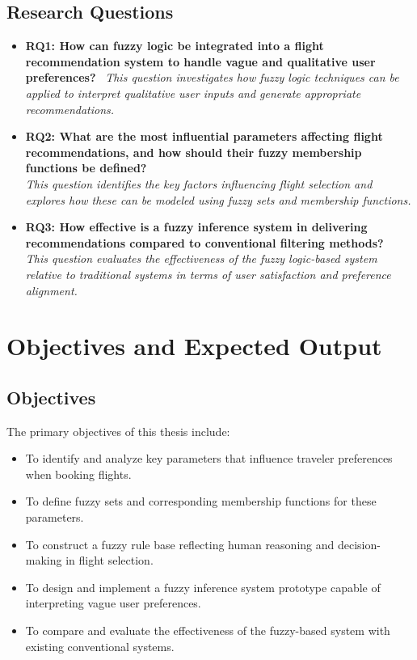 \documentclass[a4paper]{article}
\begin{document}
\subsection{Research Questions}
\begin{itemize}
\item \textbf{RQ1: How can fuzzy logic be integrated into a flight recommendation system to handle vague and qualitative user preferences?}
\ \textit{This question investigates how fuzzy logic techniques can be applied to interpret qualitative user inputs and generate appropriate recommendations.}

\item \textbf{RQ2: What are the most influential parameters affecting flight recommendations, and how should their fuzzy membership functions be defined?}
\\ \textit{This question identifies the key factors influencing flight selection and explores how these can be modeled using fuzzy sets and membership functions.}

\item \textbf{RQ3: How effective is a fuzzy inference system in delivering recommendations compared to conventional filtering methods?}
\\ \textit{This question evaluates the effectiveness of the fuzzy logic-based system relative to traditional systems in terms of user satisfaction and preference alignment.}

\end{itemize}

\section{Objectives and Expected Output}
\subsection{Objectives}
The primary objectives of this thesis include:
\begin{itemize}
\item To identify and analyze key parameters that influence traveler preferences when booking flights.
\item To define fuzzy sets and corresponding membership functions for these parameters.
\item To construct a fuzzy rule base reflecting human reasoning and decision-making in flight selection.
\item To design and implement a fuzzy inference system prototype capable of interpreting vague user preferences.
\item To compare and evaluate the effectiveness of the fuzzy-based system with existing conventional systems.
\end{itemize}
\end{document}
